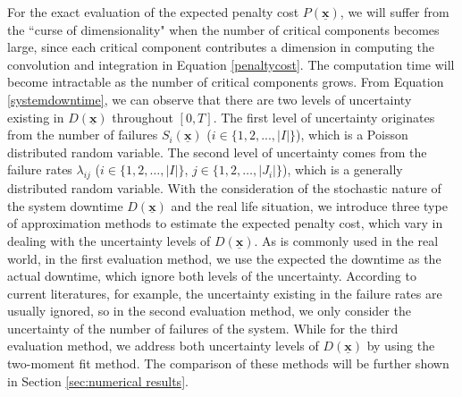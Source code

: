 \documentclass[preprint,12pt]{elsarticle}
\begin{document}
For the exact evaluation of the expected penalty cost $P(\boldsymbol{\underline{x}})$, we will suffer from the ``curse of dimensionality" when the number of critical components becomes large, since each critical component contributes a dimension in computing the convolution and integration in Equation \eqref{penaltycost}. The computation time will become intractable as the number of critical components grows. From Equation \eqref{systemdowntime}, we can observe that there are two levels of uncertainty existing in $D(\boldsymbol{\underline{x}})$ throughout $[0, T]$. The first level of uncertainty originates from the number of failures $S_{i}(\boldsymbol{\underline{x}})$ ($i \in \{1,2,...,\lvert I \rvert\}$), which is a Poisson distributed random variable. The second level of uncertainty comes from the failure rates $\lambda_{ij}$ ($i \in \{1,2,\dots,\lvert I \rvert\}$, $j \in \{1,2,\dots, \lvert J_{i} \rvert\}$), which is a generally distributed random variable. With the consideration of the stochastic nature of the system downtime $D(\boldsymbol{\underline{x}})$ and the real life situation, we introduce three type of approximation methods to estimate the expected penalty cost, which vary in dealing with the uncertainty levels of $D(\boldsymbol{\underline{x}})$. As is commonly used in the real world, in the first evaluation method, we use the expected the downtime as the actual downtime, which ignore both levels of the uncertainty. According to current literatures, for example,  the uncertainty existing in the failure rates are usually ignored, so in the second evaluation method, we only consider the uncertainty of the number of failures of the system. While for the third evaluation method, we address both uncertainty levels of $D(\boldsymbol{\underline{x}})$ by using the two-moment fit method. The comparison of these methods will be further shown in Section \ref{sec:numerical results}.
\end{document}

